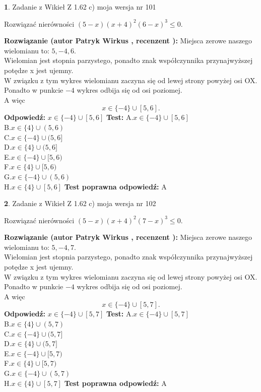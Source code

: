 \documentclass[12pt, a4paper]{article}
\theoremstyle{definition} %
\newtheorem{zad}{}
\newcommand{\zadStart}[1]{\begin{zad}#1\newline}
\newcommand{\zadStop}{\end{zad}}
\newcommand{\rozwStart}[2]{\noindent \textbf{Rozwiązanie (autor #1 , recenzent #2): }\newline}
\newcommand{\rozwStop}{\newline}
\newcommand{\odpStart}{\noindent \textbf{Odpowiedź:}\newline}
\newcommand{\odpStop}{\newline}
\newcommand{\testStart}{\noindent \textbf{Test:}\newline}
\newcommand{\testStop}{\newline}
\newcommand{\kluczStart}{\noindent \textbf{Test poprawna odpowiedź:}\newline}
\newcommand{\kluczStop}{\newline}
\begin{document}
\zadStart{Zadanie z Wikieł Z 1.62 c) moja wersja nr 101}

Rozwiązać nierówności $(5-x)(x+4)^{2}(6-x)^{3}\le0$.
\zadStop
\rozwStart{Patryk Wirkus}{}
Miejsca zerowe naszego wielomianu to: $5, -4, 6$.\\
Wielomian jest stopnia parzystego, ponadto znak współczynnika przy\linebreak najwyższej potędze x jest ujemny.\\ W związku z tym wykres wielomianu zaczyna się od lewej strony powyżej osi OX.\\
Ponadto w punkcie $-4$ wykres odbija się od osi poziomej.\\
A więc $$x \in \{-4\} \cup [5,6].$$
\rozwStop
\odpStart
$x \in \{-4\} \cup [5,6]$
\odpStop
\testStart
A.$x \in \{-4\} \cup [5,6]$\\
B.$x \in \{4\} \cup (5,6)$\\
C.$x \in \{-4\} \cup (5,6]$\\
D.$x \in \{4\} \cup (5,6]$\\
E.$x \in \{-4\} \cup [5,6)$\\
F.$x \in \{4\} \cup [5,6)$\\
G.$x \in \{-4\} \cup (5,6)$\\
H.$x \in \{4\} \cup [5,6]$
\testStop
\kluczStart
A
\kluczStop



\zadStart{Zadanie z Wikieł Z 1.62 c) moja wersja nr 102}

Rozwiązać nierówności $(5-x)(x+4)^{2}(7-x)^{3}\le0$.
\zadStop
\rozwStart{Patryk Wirkus}{}
Miejsca zerowe naszego wielomianu to: $5, -4, 7$.\\
Wielomian jest stopnia parzystego, ponadto znak współczynnika przy\linebreak najwyższej potędze x jest ujemny.\\ W związku z tym wykres wielomianu zaczyna się od lewej strony powyżej osi OX.\\
Ponadto w punkcie $-4$ wykres odbija się od osi poziomej.\\
A więc $$x \in \{-4\} \cup [5,7].$$
\rozwStop
\odpStart
$x \in \{-4\} \cup [5,7]$
\odpStop
\testStart
A.$x \in \{-4\} \cup [5,7]$\\
B.$x \in \{4\} \cup (5,7)$\\
C.$x \in \{-4\} \cup (5,7]$\\
D.$x \in \{4\} \cup (5,7]$\\
E.$x \in \{-4\} \cup [5,7)$\\
F.$x \in \{4\} \cup [5,7)$\\
G.$x \in \{-4\} \cup (5,7)$\\
H.$x \in \{4\} \cup [5,7]$
\testStop
\kluczStart
A
\kluczStop
\end{document}
